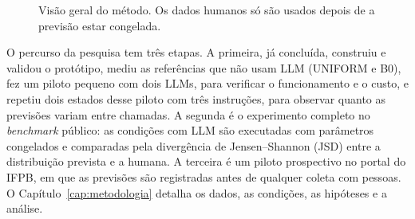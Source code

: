 \documentclass[12pt,oneside,a4paper,chapter=TITLE,english,brazil]{abntex2}
\newcommand{\Pp}{\hat{P}}
\begin{document}
\begin{figure}[htb]
\centering
\caption{Visão geral do método. Os dados humanos só são usados depois de a previsão estar congelada.}
\label{fig:visao}
\end{figure}

O percurso da pesquisa tem três etapas. A primeira, já concluída, construiu e validou o protótipo, mediu as referências que não usam LLM (UNIFORM e B0), fez um piloto pequeno com dois LLMs, para verificar o funcionamento e o custo, e repetiu dois estados desse piloto com três instruções, para observar quanto as previsões variam entre chamadas. A segunda é o experimento completo no \textit{benchmark} público: as condições com LLM são executadas com parâmetros congelados e comparadas pela divergência de Jensen--Shannon (JSD) entre a distribuição prevista e a humana. A terceira é um piloto prospectivo no portal do IFPB, em que as previsões são registradas antes de qualquer coleta com pessoas. O Capítulo~\ref{cap:metodologia} detalha os dados, as condições, as hipóteses e a análise.
\end{document}
